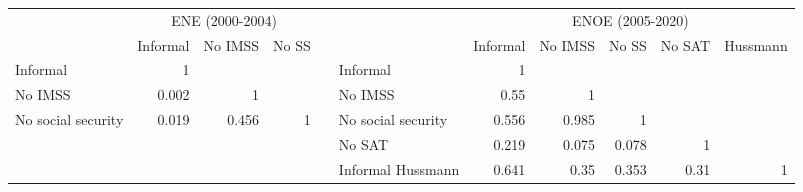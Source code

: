 \begin{tabular}{rrrrrl|rrrrr}
\cmidrule{1-4}\cmidrule{6-11}      & \multicolumn{3}{c}{ENE (2000-2004)} &       & \multicolumn{1}{r}{} & \multicolumn{5}{c}{ENOE (2005-2020)} \\
\cmidrule{2-4}\cmidrule{7-11}\multicolumn{1}{r|}{} & \multicolumn{1}{l}{Informal} & \multicolumn{1}{l}{No IMSS} & \multicolumn{1}{l}{No SS} &       &       & \multicolumn{1}{l}{Informal} & \multicolumn{1}{l}{No IMSS} & \multicolumn{1}{l}{No SS} & \multicolumn{1}{l}{No SAT} & \multicolumn{1}{l}{Hussmann} \\
\cmidrule{1-4}\cmidrule{6-11}\multicolumn{1}{l|}{Informal} & 1     &       &       &       & Informal & 1     &       &       &       &  \\
\multicolumn{1}{l|}{No IMSS} & 0.002 & 1     &       &       & No IMSS & 0.55  & 1     &       &       &  \\
\multicolumn{1}{l|}{No social security} & 0.019 & 0.456 & 1     &       & No social security & 0.556 & 0.985 & 1     &       &  \\
\cmidrule{1-4}      &       &       &       &       & No SAT & 0.219 & 0.075 & 0.078 & 1     &  \\
      &       &       &       &       & Informal Hussmann & 0.641 & 0.35  & 0.353 & 0.31  & 1 \\
\cmidrule{6-11}\end{tabular}%
